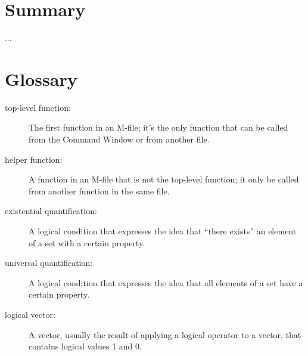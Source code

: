 \section{Summary}
...

\section{Glossary}

\begin{description}

\item[top-level function:]  The first function in an M-file;
it's the only function that can be called from the Command
Window or from another file.

\item[helper function:] A function in an M-file that is not
the top-level function; it only be called from another function
in the same file.

\item[existential quantification:] A logical condition that expresses
the idea that ``there exists'' an element of a set with a certain
property.

\item[universal quantification:] A logical condition that expresses
the idea that all elements of a set have a certain property.

\item[logical vector:] A vector, usually the result of applying a logical
operator to a vector, that contains logical values 1 and 0.


\end{description}



